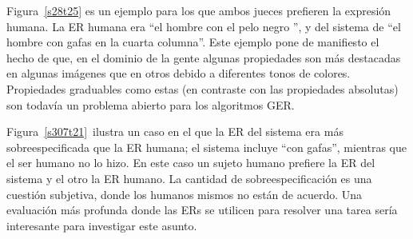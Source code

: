 


Figura~\ref{s28t25} es un ejemplo para los que ambos jueces prefieren la expresi\'on humana. La ER humana era ``el hombre con el pelo negro '', y del sistema de ``el hombre con gafas en la cuarta columna''. Este ejemplo pone de manifiesto el hecho de que, en el dominio de la gente algunas propiedades son m\'as destacadas en algunas im\'agenes que en otros debido a diferentes tonos de colores. Propiedades graduables como estas (en contraste con las propiedades absolutas) son todav\'{i}a un problema abierto para los algoritmos GER.

Figura~\ref{s307t21}~ilustra un caso en el que la ER del sistema era m\'as sobreespecificada que la ER humana; el sistema incluye ``con gafas'', mientras que el ser humano no lo hizo. En este caso un sujeto humano prefiere la ER del sistema y el otro la ER humano. La cantidad de sobreespecificaci\'on es una cuesti\'on subjetiva, donde los humanos mismos no est\'an de acuerdo. Una evaluaci\'on m\'as profunda donde las ERs se utilicen para resolver una tarea ser\'{i}a interesante para investigar este asunto.



